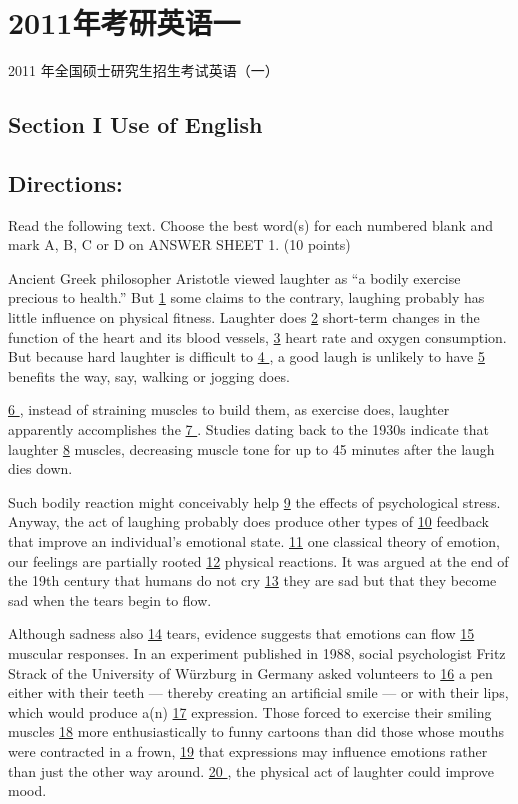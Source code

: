 \documentclass[UTF8,11pt]{ctexart}
\begin{document}
\section*{2011年考研英语一}
2011 年全国硕士研究生招生考试英语（一）


\subsection*{\textbf{Section I Use of English}}


\subsection*{\textbf{Directions:}}


Read the following text. Choose the best word(s) for each numbered blank and mark A, B, C or D on ANSWER SHEET 1. (10 points)


Ancient Greek philosopher Aristotle viewed laughter as “a bodily exercise precious to health.” But \uline{1} some claims to the contrary, laughing probably has little influence on physical fitness. Laughter does \uline{2} short-term changes in the function of the heart and its blood vessels, \uline{3} heart rate and oxygen consumption. But because hard laughter is difficult to \uline{4 }, a good laugh is unlikely to have \uline{5} benefits the way, say, walking or jogging does.


\uline{6 }, instead of straining muscles to build them, as exercise does, laughter apparently accomplishes the \uline{7 }. Studies dating back to the 1930s indicate that laughter \uline{8} muscles, decreasing muscle tone for up to 45 minutes after the laugh dies down.


Such bodily reaction might conceivably help \uline{9} the effects of psychological stress. Anyway, the act of laughing probably does produce other types of \uline{10} feedback that improve an individual's emotional state. \uline{11} one classical theory of emotion, our feelings are partially rooted \uline{12} physical reactions. It was argued at the end of the 19th century that humans do not cry \uline{13} they are sad but that they become sad when the tears begin to flow.


Although sadness also \uline{14} tears, evidence suggests that emotions can flow \uline{15} muscular responses. In an experiment published in 1988, social psychologist Fritz Strack of the University of Würzburg in Germany asked volunteers to \uline{16} a pen either with their teeth — thereby creating an artificial smile — or with their lips, which would produce a(n) \uline{17} expression. Those forced to exercise their smiling muscles \uline{18} more enthusiastically to funny cartoons than did those whose mouths were contracted in a frown, \uline{19} that expressions may influence emotions rather than just the other way around. \uline{20 }, the physical act of laughter could improve mood.
\end{document}
